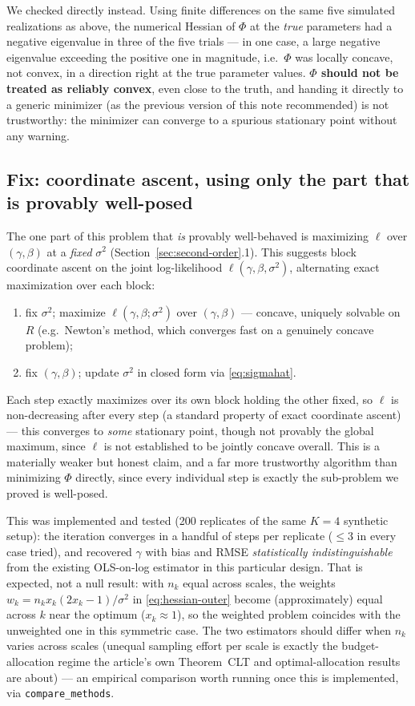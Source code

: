\documentclass[11pt]{article}
\begin{document}
We checked directly instead. Using finite differences on the same five
simulated realizations as above, the numerical Hessian of $\Phi$ at the
\emph{true} parameters had a negative eigenvalue in three of the five trials
--- in one case, a large negative eigenvalue exceeding the positive one in
magnitude, i.e.\ $\Phi$ was locally concave, not convex, in a direction right
at the true parameter values. \textbf{$\Phi$ should not be treated as
reliably convex}, even close to the truth, and handing it directly to a
generic minimizer (as the previous version of this note recommended) is not
trustworthy: the minimizer can converge to a spurious stationary point
without any warning.

\subsection{Fix: coordinate ascent, using only the part that is provably well-posed}

The one part of this problem that \emph{is} provably well-behaved is
maximizing $\ell$ over $(\gamma,\beta)$ at a \emph{fixed} $\sigma^2$
(Section~\ref{sec:second-order}.1). This suggests block coordinate ascent on
the joint log-likelihood $\ell(\gamma,\beta,\sigma^2)$, alternating exact
maximization over each block:
\begin{enumerate}
\item[(a)] fix $\sigma^2$; maximize $\ell(\gamma,\beta;\sigma^2)$ over
      $(\gamma,\beta)$ --- concave, uniquely solvable on $R$ (e.g.\ Newton's
      method, which converges fast on a genuinely concave problem);
\item[(b)] fix $(\gamma,\beta)$; update $\sigma^2$ in closed form via
      \eqref{eq:sigmahat}.
\end{enumerate}
Each step exactly maximizes over its own block holding the other fixed, so
$\ell$ is non-decreasing after every step (a standard property of exact
coordinate ascent) --- this converges to \emph{some} stationary point, though
not provably the global maximum, since $\ell$ is not established to be
jointly concave overall. This is a materially weaker but honest claim, and a
far more trustworthy algorithm than minimizing $\Phi$ directly, since every
individual step is exactly the sub-problem we proved is well-posed.

This was implemented and tested (200 replicates of the same $K=4$ synthetic
setup): the iteration converges in a handful of steps per replicate ($\le 3$
in every case tried), and recovered $\gamma$ with bias and RMSE
\emph{statistically indistinguishable} from the existing OLS-on-log
estimator in this particular design. That is expected, not a null result: with
$n_k$ equal across scales, the weights $w_k = n_k x_k(2x_k-1)/\sigma^2$ in
\eqref{eq:hessian-outer} become (approximately) equal across $k$ near the
optimum ($x_k\approx1$), so the weighted problem coincides with the
unweighted one in this symmetric case. The two estimators should differ when
$n_k$ varies across scales (unequal sampling effort per scale is exactly the
budget-allocation regime the article's own Theorem~CLT and optimal-allocation
results are about) --- an empirical comparison worth running once this is
implemented, via \texttt{compare\_methods}.
\end{document}
